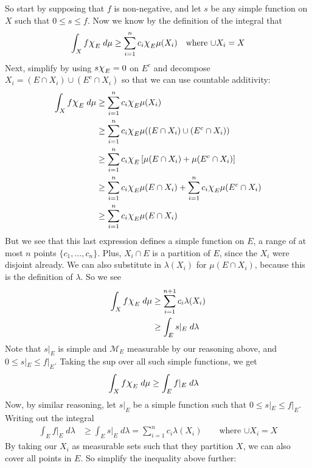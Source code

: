 \documentclass[12pt]{article}
\theoremstyle{plain}
\theoremstyle{definition}
\theoremstyle{remark}
\newcommand*{\Chi}{\mbox{\large$\chi$}} %
\begin{document}
\begin{enumerate}
\begin{enumerate}
So start by supposing that $f$ is non-negative, and let $s$ be any simple function on $X$ such that $0\leq s\leq f$. Now we know by the definition of the integral that
\begin{align*}
    \int_X f\Chi_E \; d\mu \geq \sum^n_{i=1} c_i \Chi_E \mu(X_i)
    \quad \text{where $\cup X_i = X$}
\end{align*}
Next, simplify by using $s\Chi_E = 0$ on $E^c$ and decompose $X_i = (E\cap X_i) \cup (E^c\cap X_i)$ so that we can use countable additivity:
\begin{align*}
    \int_X f\Chi_E \; d\mu &\geq \sum^n_{i=1} c_i \Chi_E \mu(X_i) \\
    &\geq \sum^n_{i=1} c_i \Chi_E \mu((E\cap X_i) \cup (E^c\cap X_i)) \\
    &\geq \sum^n_{i=1} c_i \Chi_E \left[\mu(E\cap X_i) +\mu(E^c\cap X_i)\right]  \\
    &\geq \sum^n_{i=1} c_i \Chi_E \mu(E\cap X_i) 
        +\sum^n_{i=1} c_i \Chi_E\mu(E^c\cap X_i)  \\
    &\geq \sum^n_{i=1} c_i \Chi_E \mu(E\cap X_i)  
\end{align*}
But we see that this last expression defines a simple function on $E$, a range of at most $n$ points $\{c_1,\ldots,c_n\}$. Plus, $X_i\cap E$ is a partition of $E$, since the $X_i$ were disjoint already. We can also substitute in $\lambda(X_i)$ for $\mu(E\cap X_i)$, because this is the definition of $\lambda$. So we see
\begin{align*}
    \int_X f\Chi_E \; d\mu 
        &\geq \sum^{n+1}_{i=1} c_i \lambda(X_i)  \\
        &\geq \int_E s|_E \; d\lambda
\end{align*}
Note that $s|_E$ is simple and $\mathscr{M}_E$ measurable by our reasoning above, and $0\leq s|_E\leq f|_E$. Taking the sup over all such simple functions, we get
\begin{align}
    \label{q1.geq1}
    \int_X f\Chi_E \; d\mu 
        &\geq \int_E f|_E \; d\lambda
\end{align}
Now, by similar reasoning, let $s|_E$ be a simple function such that $0\leq s|_E \leq f|_E$. Writing out the integral
\begin{align*}
    \int_E f|_E \; d\lambda
        &\geq \int_E s|_E \; d\lambda 
        = \sum^n_{i=1} c_i \lambda(X_i) 
        \qquad \text{where $\cup X_i=X$} 
\end{align*}
By taking our $X_i$ as measurable sets such that they partition $X$, we can also cover all points in $E$. So simplify the inequality above further:

\end{enumerate}
\end{enumerate}
\end{document}
